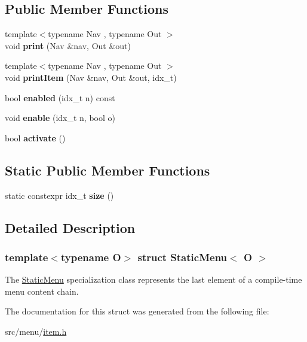 \subsection*{Public Member Functions}
\begin{DoxyCompactItemize}
\item 
\mbox{\label{structStaticMenu_3_01O_01_4_ac144eee854ed83d5f6b698fc8b6d7d1a}} 
{\footnotesize template$<$typename Nav , typename Out $>$ }\\void {\bfseries print} (Nav \&nav, Out \&out)
\item 
\mbox{\label{structStaticMenu_3_01O_01_4_a0a4a691bc71c590c332f429d1ed37c43}} 
{\footnotesize template$<$typename Nav , typename Out $>$ }\\void {\bfseries print\+Item} (Nav \&nav, Out \&out, idx\+\_\+t)
\item 
\mbox{\label{structStaticMenu_3_01O_01_4_aa651dbed34cd3a7962f74d6e529b3536}} 
bool {\bfseries enabled} (idx\+\_\+t n) const
\item 
\mbox{\label{structStaticMenu_3_01O_01_4_a9ac6bf31ac978402677624154fc1fb45}} 
void {\bfseries enable} (idx\+\_\+t n, bool o)
\item 
\mbox{\label{structStaticMenu_3_01O_01_4_a768d65241b46a4763f6b253081c2348b}} 
bool {\bfseries activate} ()
\end{DoxyCompactItemize}
\subsection*{Static Public Member Functions}
\begin{DoxyCompactItemize}
\item 
\mbox{\label{structStaticMenu_3_01O_01_4_a52928088bcc67fca7814972947ea2258}} 
static constexpr idx\+\_\+t {\bfseries size} ()
\end{DoxyCompactItemize}


\subsection{Detailed Description}
\subsubsection*{template$<$typename O$>$\newline
struct Static\+Menu$<$ O $>$}

The \hyperlink{classStaticMenu}{Static\+Menu} specialization class represents the last element of a compile-\/time menu content chain. 

The documentation for this struct was generated from the following file\+:\begin{DoxyCompactItemize}
\item 
src/menu/\hyperlink{item_8h}{item.\+h}\end{DoxyCompactItemize}

